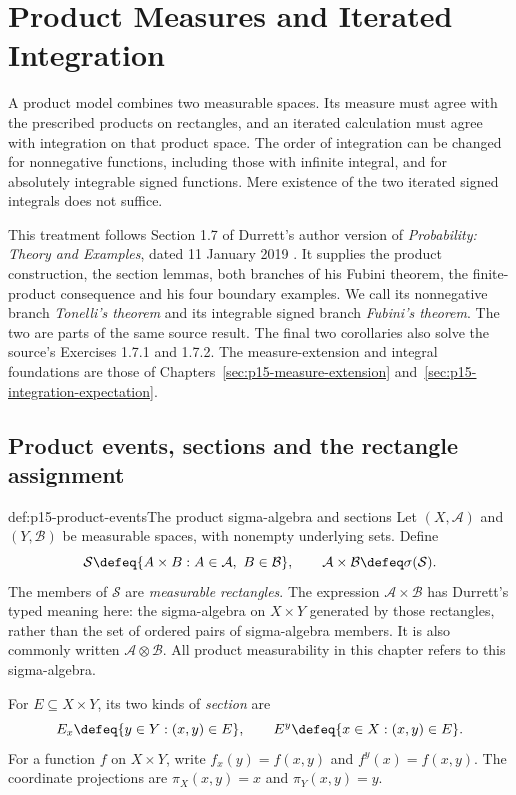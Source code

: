\chapter{Product Measures and Iterated Integration}
\label{sec:p15-product-measures}

A product model combines two measurable spaces. Its measure must agree
with the prescribed products on rectangles, and an iterated calculation
must agree with integration on that product space. The order of integration
can be changed for nonnegative functions, including those with infinite
integral, and for absolutely integrable signed functions. Mere existence
of the two iterated signed integrals does not suffice.

This treatment follows Section 1.7 of Durrett's author version of
\emph{Probability: Theory and Examples}, dated 11 January 2019
\cite[pp.~37--41]{DurrettPTEAuthor2019}. It supplies the product construction,
the section lemmas, both branches of his Fubini theorem, the finite-product
consequence and his four boundary examples. We call its nonnegative branch
\emph{Tonelli's theorem} and its integrable signed branch \emph{Fubini's
theorem}. The two are parts of the same source result. The final two
corollaries also solve the source's Exercises 1.7.1 and 1.7.2.
The measure-extension and integral foundations are those of
Chapters~\ref{sec:p15-measure-extension}
and~\ref{sec:p15-integration-expectation}.

\section{Product events, sections and the rectangle assignment}
\label{sec:p15-product-events}

\begin{hbdefinition}{def:p15-product-events}{The product sigma-algebra and sections}
Let \((X,\mathcal A)\) and \((Y,\mathcal B)\) be measurable spaces,
with nonempty underlying sets. Define
\[
 \mathcal S\defeq\{A\times B:A\in\mathcal A,\ B\in\mathcal B\},
 \qquad
 \mathcal A\times\mathcal B\defeq\sigma(\mathcal S).
\]
The members of \(\mathcal S\) are \emph{measurable rectangles}.
The expression \(\mathcal A\times\mathcal B\) has Durrett's typed
meaning here: the sigma-algebra on \(X\times Y\) generated by those
rectangles, rather than the set of ordered pairs of sigma-algebra members.
It is also commonly written \(\mathcal A\otimes\mathcal B\).
All product measurability in this chapter refers to this sigma-algebra.

For \(E\subseteq X\times Y\), its two kinds of \emph{section} are
\[
 E_x\defeq\{y\in Y:(x,y)\in E\},\qquad
 E^y\defeq\{x\in X:(x,y)\in E\}.
\]
For a function \(f\) on \(X\times Y\), write
\(f_x(y)=f(x,y)\) and \(f^y(x)=f(x,y)\).
The coordinate projections are \(\pi_X(x,y)=x\) and
\(\pi_Y(x,y)=y\).
\end{hbdefinition}

